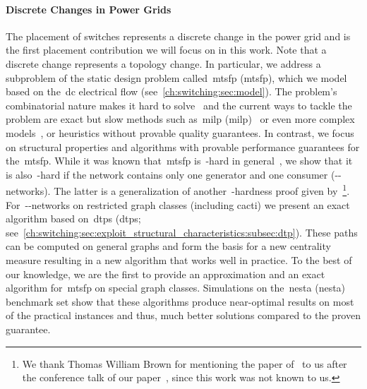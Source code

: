 \paragraph{Discrete Changes in Power Grids}
% 
The placement of switches represents a discrete change in the power grid and is
the first placement contribution we will focus on in this work. Note that a
discrete change represents a topology change. In particular, we address a
subproblem of the static design problem called~\acrlong{mtsfp}
(\acrshort{mtsfp}), which we model based on the~\acrshort{dc} electrical flow
(see~\cref{ch:switching:sec:model}). The problem's combinatorial nature makes it
hard to solve~\parencite{Leh14} and the current ways to tackle the problem are
exact but slow methods such as~\acrlong{milp}
(\acrshort{milp})~\parencite{Fis08} or even more complex
models~\parencite{6253283,HAGHIGHAT2015104}, or heuristics without provable
quality guarantees.
%
In contrast, we focus on structural properties and algorithms with provable
performance guarantees for the~\gls{mtsfp}. While it was known that~\gls{mtsfp}
is~\NP-hard in general~\parencite{Leh14}, we show that it is
% 
also~\NP-hard if the network contains only one generator and one consumer  
% 
(\source-\sink-networks). The latter is a generalization of another~\NP-hardness
proof given by~\textcite{Koc16}\footnote{We thank Thomas William Brown for
mentioning the paper of~\textcite{Koc16} to us after the conference talk of our 
paper~\parencite{Gra18}, since this work was not known to us.}.
For~\source-\sink-networks on restricted graph classes (including cacti) we
present an exact algorithm based on~\acrlong{dtp}{s} (\acrshort{dtp}s;
see~\cref{ch:switching:sec:exploit_structural_characteristics:subsec:dtp}).
These paths can be computed on general graphs and form the basis for a new
centrality measure resulting in a new algorithm that works well in practice.
% 
To the best of our knowledge, we are the first to provide an approximation and
an exact algorithm for~\gls{mtsfp} on special graph classes. Simulations on
the~\acrlong{nesta} (\gls{nesta}) benchmark set show that these algorithms
produce near-optimal results on most of the practical instances and thus, much
better solutions compared to the proven guarantee.
% 
